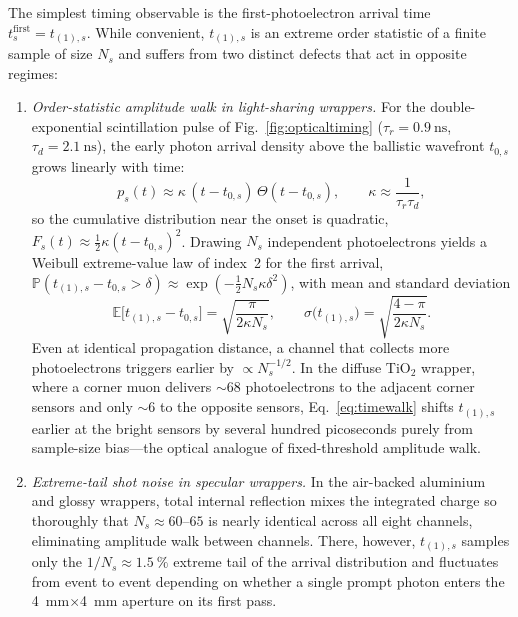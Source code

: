\documentclass[11pt,a4paper]{article}
\begin{document}
The simplest timing observable is the first-photoelectron arrival time
$t^{\mathrm{first}}_s = t_{(1),s}$.  While convenient, $t_{(1),s}$ is an extreme
order statistic of a finite sample of size $N_s$ and suffers from two distinct
defects that act in opposite regimes:
\begin{enumerate}
  \item \emph{Order-statistic amplitude walk in light-sharing wrappers.}
        For the double-exponential scintillation pulse of
        Fig.~\ref{fig:opticaltiming} ($\tau_r = \SI{0.9}{\nano\second}$,
        $\tau_d = \SI{2.1}{\nano\second}$), the early photon arrival density
        above the ballistic wavefront $t_{0,s}$ grows linearly with time:
        \begin{equation}
          p_s(t) \approx \kappa\,(t - t_{0,s})\,\Theta(t - t_{0,s}),
          \qquad \kappa \approx \frac{1}{\tau_r\tau_d},
        \end{equation}
        so the cumulative distribution near the onset is quadratic,
        $F_s(t) \approx \frac{1}{2}\kappa(t - t_{0,s})^2$.  Drawing $N_s$
        independent photoelectrons yields a Weibull extreme-value law of index~2
        for the first arrival, $\mathbb{P}(t_{(1),s} - t_{0,s} > \delta)
        \approx \exp(-\frac{1}{2} N_s \kappa \delta^2)$, with mean and
        standard deviation
        \begin{equation}
          \mathbb{E}\bigl[t_{(1),s} - t_{0,s}\bigr]
          = \sqrt{\frac{\pi}{2\kappa N_s}},
          \qquad
          \sigma\bigl(t_{(1),s}\bigr)
          = \sqrt{\frac{4-\pi}{2\kappa N_s}}.
          \label{eq:timewalk}
        \end{equation}
        Even at identical propagation distance, a channel that collects more
        photoelectrons triggers earlier by $\propto N_s^{-1/2}$.  In the
        diffuse TiO$_2$ wrapper, where a corner muon delivers $\sim 68$
        photoelectrons to the adjacent corner sensors and only $\sim 6$ to the
        opposite sensors, Eq.~\ref{eq:timewalk} shifts $t_{(1),s}$ earlier at
        the bright sensors by several hundred picoseconds purely from sample-size
        bias---the optical analogue of fixed-threshold amplitude walk.
  \item \emph{Extreme-tail shot noise in specular wrappers.}
        In the air-backed aluminium and glossy wrappers, total internal
        reflection mixes the integrated charge so thoroughly that $N_s \approx
        60\text{--}65$ is nearly identical across all eight channels, eliminating
        amplitude walk between channels.  There, however, $t_{(1),s}$ samples
        only the $1/N_s \approx \SI{1.5}{\percent}$ extreme tail of the arrival
        distribution and fluctuates from event to event depending on whether a
        single prompt photon enters the \SI{4}{\milli\meter}$\times$\SI{4}{\milli\meter}
        aperture on its first pass.
\end{enumerate}
\end{document}
